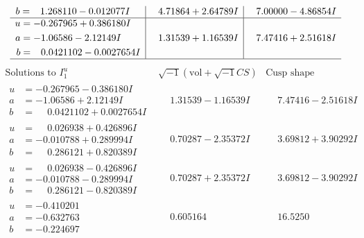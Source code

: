\documentclass[1p]{elsarticle_modified}
\theoremstyle{definition}
\newcommand{\I}{\sqrt{-1}}
\begin{document}
$$\begin{array}{c|c|c}
\begin{aligned}
b &= \phantom{-}1.268110 - 0.012077 I\end{aligned}
 & \phantom{-}4.71864 + 2.64789 I & \phantom{-}7.00000 - 4.86854 I \\ \hline\begin{aligned}
u &= -0.267965 + 0.386180 I \\
a &= -1.06586 - 2.12149 I \\
b &= \phantom{-}0.0421102 - 0.0027654 I\end{aligned}
 & \phantom{-}1.31539 + 1.16539 I & \phantom{-}7.47416 + 2.51618 I\\
 \hline 
 \end{array}$$\newpage$$\begin{array}{c|c|c}  
\text{Solutions to }I^u_{1}& \I (\text{vol} + \sqrt{-1}CS) & \text{Cusp shape}\\
 \hline 
\begin{aligned}
u &= -0.267965 - 0.386180 I \\
a &= -1.06586 + 2.12149 I \\
b &= \phantom{-}0.0421102 + 0.0027654 I\end{aligned}
 & \phantom{-}1.31539 - 1.16539 I & \phantom{-}7.47416 - 2.51618 I \\ \hline\begin{aligned}
u &= \phantom{-}0.026938 + 0.426896 I \\
a &= -0.010788 + 0.289994 I \\
b &= \phantom{-}0.286121 + 0.820389 I\end{aligned}
 & \phantom{-}0.70287 - 2.35372 I & \phantom{-}3.69812 + 3.90292 I \\ \hline\begin{aligned}
u &= \phantom{-}0.026938 - 0.426896 I \\
a &= -0.010788 - 0.289994 I \\
b &= \phantom{-}0.286121 - 0.820389 I\end{aligned}
 & \phantom{-}0.70287 + 2.35372 I & \phantom{-}3.69812 - 3.90292 I \\ \hline\begin{aligned}
u &= -0.410201\phantom{ +0.000000I} \\
a &= -0.632763\phantom{ +0.000000I} \\
b &= -0.224697\phantom{ +0.000000I}\end{aligned}
 & \phantom{-}0.605164\phantom{ +0.000000I} & \phantom{-}16.5250\phantom{ +0.000000I} \\ \hline\begin{aligned}

\end{aligned}
\end{array}$$
\end{document}
